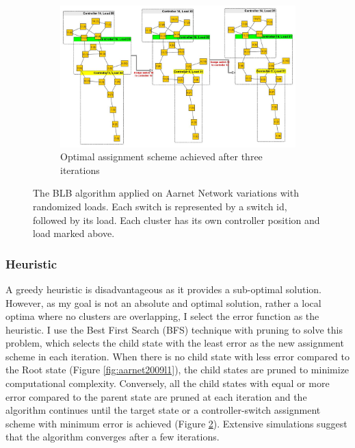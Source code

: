 \documentclass[preprint,12pt]{elsarticle}
\begin{document}
\begin{figure}
\begin{subfigure}{0.3\textwidth}
		\end{subfigure}
		~
		\begin{subfigure}{\textwidth}
			\includegraphics[width=\linewidth]{Images/Aarnet_Load_2.jpg}
			\caption{Optimal assignment scheme achieved after three iterations}
			\label{fig:aarnet2009l2}
		\end{subfigure}
		\caption{The BLB algorithm applied on Aarnet Network variations with randomized loads. Each switch is represented by a switch id, followed by its load. Each cluster has its own controller position and load marked above.}
	\end{figure}

	\subsubsection{Heuristic}
	A greedy heuristic is disadvantageous as it provides a sub-optimal solution. However, as my goal is not an absolute and optimal solution, rather a local optima where no clusters are overlapping, I select the error function as the heuristic. I use the Best First Search (BFS) technique with pruning to solve this problem, which selects the child state with the least error as the new assignment scheme in each iteration. When there is no child state with less error compared to the Root state (Figure \ref{fig:aarnet2009l1}), the child states are pruned to minimize computational complexity. Conversely, all the child states with equal or more error compared to the parent state are pruned at each iteration and the algorithm continues until the target state or a controller-switch assignment scheme with minimum error is achieved  (Figure \ref{fig:aarnet2009l2}). Extensive simulations suggest that the algorithm converges after a few iterations.
	
\end{document}
